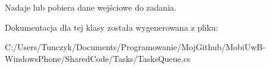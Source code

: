 Nadaje lub pobiera dane wejściowe do zadania. 



Dokumentacja dla tej klasy została wygenerowana z pliku\+:\begin{DoxyCompactItemize}
\item 
C\+:/\+Users/\+Tunczyk/\+Documents/\+Programowanie/\+Moj\+Github/\+Mobi\+Uw\+B-\/\+Windows\+Phone/\+Shared\+Code/\+Tasks/Tasks\+Queue.\+cs\end{DoxyCompactItemize}
